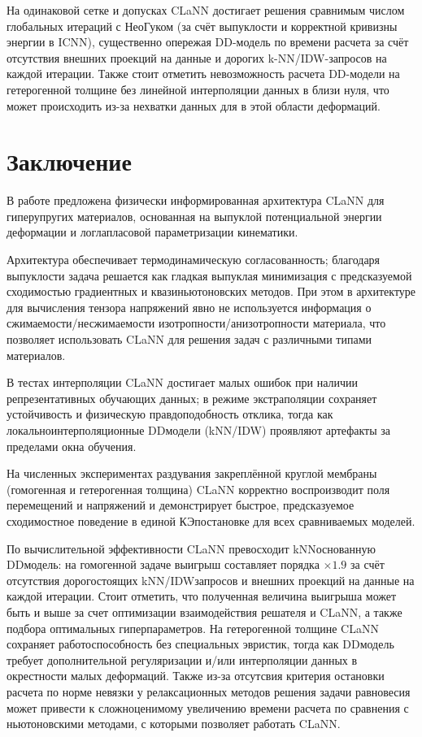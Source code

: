 На одинаковой сетке и допусках CLaNN достигает решения сравнимым числом глобальных итераций с Нео\textendash Гуком
(за счёт выпуклости и корректной кривизны энергии в ICNN), существенно опережая DD-модель по времени расчета
за счёт отсутствия внешних проекций на данные и дорогих k-NN/IDW-запросов на каждой итерации.
Также стоит отметить невозможность расчета DD-модели на гетерогенной толщине без линейной интерполяции данных в близи нуля, 
что может происходить из-за нехватки данных для в этой области деформаций.


\section{Заключение}

  В работе предложена физически информированная архитектура CLaNN для гиперупругих материалов, основанная на выпуклой
  потенциальной энергии деформации и лог\textendash лапласовой параметризации кинематики.

  Архитектура обеспечивает термодинамическую согласованность; благодаря
  выпуклости задача решается как гладкая выпуклая минимизация с предсказуемой сходимостью градиентных и
  квазиньютоновских методов. 
  При этом в архитектуре для вычисления тензора напряжений явно не используется информация о сжимаемости/несжимаемости изотропности/анизотропности
  материала, что позволяет использовать CLaNN для решения задач с различными типами материалов.

  В тестах интерполяции CLaNN достигает малых ошибок при наличии репрезентативных обучающих данных; в режиме
  экстраполяции сохраняет устойчивость и физическую правдоподобность отклика,
  тогда как локально\textendash интерполяционные DD\textendash модели (k\textendash NN/IDW) проявляют артефакты за пределами окна обучения.

  На численных экспериментах раздувания закреплённой круглой мембраны (гомогенная и гетерогенная толщина) CLaNN корректно
  воспроизводит поля перемещений и напряжений и демонстрирует быстрое, предсказуемое сходимостное поведение в единой
  КЭ\textendash постановке для всех сравниваемых моделей.

  По вычислительной эффективности CLaNN превосходит kNN\textendash основанную DD\textendash модель: на гомогенной задаче выигрыш составляет
  порядка $\times 1.9$ за счёт отсутствия дорогостоящих k\textendash NN/IDW\textendash запросов и внешних проекций на данные на каждой итерации. 
  Стоит отметить, что полученная величина выигрыша может быть и выше за счет оптимизации взаимодействия решателя и CLaNN, а также подбора оптимальных гиперпараметров.
  На гетерогенной толщине CLaNN сохраняет работоспособность без специальных эвристик, 
  тогда как DD\textendash модель требует дополнительной регуляризации и/или интерполяции данных в окрестности малых деформаций.
  Также из-за отсутсвия критерия остановки расчета по норме невязки у релаксационных методов решения задачи равновесия может привести к сложноценимому увеличению времени расчета
  по сравнения с ньютоновскими методами, с которыми позволяет работать CLaNN.

